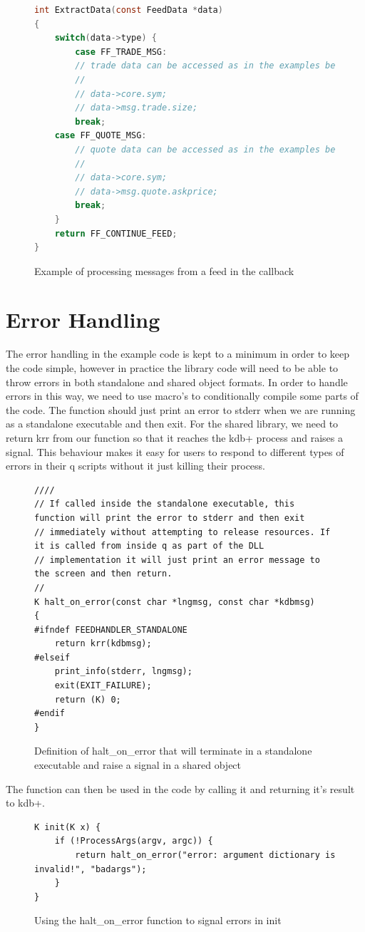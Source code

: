 \begin{figure}
\begin{lstlisting}[language=C]
int ExtractData(const FeedData *data)
{
	switch(data->type) {
		case FF_TRADE_MSG:
		// trade data can be accessed as in the examples below.
		//
		// data->core.sym;
		// data->msg.trade.size;
		break;
	case FF_QUOTE_MSG:
		// quote data can be accessed as in the examples below.
		//
		// data->core.sym;
		// data->msg.quote.askprice;
		break;
	}
	return FF_CONTINUE_FEED;
}

\end{lstlisting}
\caption{Example of processing messages from a feed in the callback}
\end{figure}

\section{Error Handling}

The error handling in the example code is kept to a minimum in order to keep the code simple, however in practice the
library code will need to be able to throw errors in both standalone and shared object formats. In order to handle errors
in this way, we need to use macro's to conditionally compile some parts of the code. The function should just print an
error to stderr when we are running as a standalone executable and then exit. For the shared library, we need to return
krr from our function so that it reaches the kdb+ process and raises a signal. This behaviour makes it easy for users to
respond to different types of errors in their q scripts without it just killing their process.

\begin{figure}
\begin{lstlisting}
////
// If called inside the standalone executable, this function will print the error to stderr and then exit
// immediately without attempting to release resources. If it is called from inside q as part of the DLL
// implementation it will just print an error message to the screen and then return.
//
K halt_on_error(const char *lngmsg, const char *kdbmsg)
{
#ifndef FEEDHANDLER_STANDALONE
	return krr(kdbmsg);
#elseif
	print_info(stderr, lngmsg);
	exit(EXIT_FAILURE);
	return (K) 0;
#endif
}
\end{lstlisting}
\caption{Definition of halt\_on\_error that will terminate in a standalone executable and raise a signal in a shared object}
\end{figure}

The function can then be used in the code by calling it and returning it's result to kdb+. 

\begin{figure}
\begin{lstlisting}
K init(K x) {
	if (!ProcessArgs(argv, argc)) {
		return halt_on_error("error: argument dictionary is invalid!", "badargs");
	}
}
\end{lstlisting}
\caption{Using the halt\_on\_error function to signal errors in init}
\end{figure}
